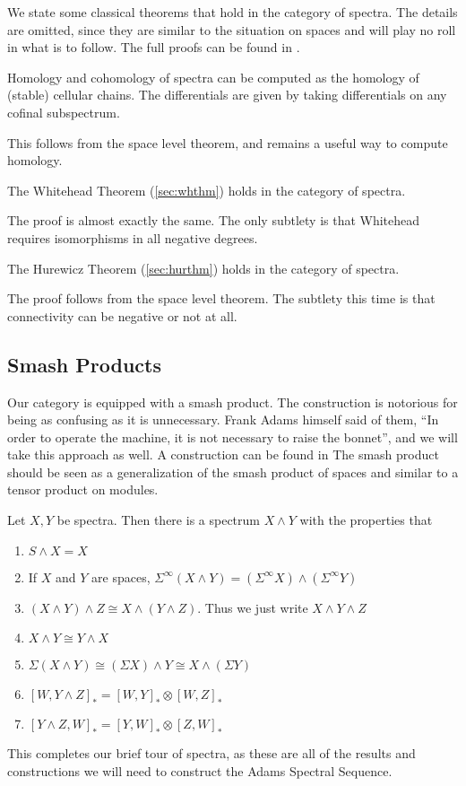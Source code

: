 We state some classical theorems that hold in the category of spectra.
The details are omitted, since they are similar to the situation on spaces and will play no roll in what is to follow.  
The full proofs can be found in \cite[Ch~2]{AdamsStable}.  

\begin{Theorem}
  Homology and cohomology of spectra can be computed as the homology of (stable) cellular chains.  
  The differentials are given by taking differentials on any cofinal subspectrum.
\end{Theorem}

This follows from the space level theorem, and remains a useful way to compute homology.  

\begin{Theorem}
  The Whitehead Theorem (\ref{sec:whthm}) holds in the category of spectra.
\end{Theorem}

The proof is almost exactly the same.  
The only subtlety is that Whitehead requires isomorphisms in all negative degrees.

\begin{Theorem}
  The Hurewicz Theorem (\ref{sec:hurthm}) holds in the category of spectra.
\end{Theorem}

The proof follows from the space level theorem.
The subtlety this time is that connectivity can be negative or not at all.  


\subsection{Smash Products}

Our category is equipped with a smash product.
The construction is notorious for being as confusing as it is unnecessary.  Frank Adams himself said of them,  
``In order to operate the machine, it is not necessary to raise the bonnet'', and we will take this approach as well.  
A construction can be found in \cite[Ch~4]{AdamsStable}
The smash product should be seen as a generalization of the smash product of spaces and similar to a tensor product on modules.  

\begin{Theorem}
  Let $X,Y$ be spectra.  Then there is a spectrum $X\wedge Y$ with the properties that
  \begin{enumerate}
    \item $S\wedge X=X$
    \item If $X$ and $Y$ are spaces, $\Sigma^\infty(X\wedge Y)=(\Sigma^\infty X)\wedge (\Sigma^\infty Y)$
    \item $(X\wedge Y)\wedge Z\cong X\wedge (Y\wedge Z)$.  
      Thus we just write $X\wedge Y\wedge Z$
    \item  $X\wedge Y\cong Y\wedge X$
    \item  $\Sigma(X\wedge Y)\cong(\Sigma X)\wedge Y\cong X\wedge (\Sigma Y)$
    \item $[W,Y\wedge Z]_*=[W,Y]_*\otimes [W,Z]_*$
    \item $[Y\wedge Z,W]_*=[Y,W]_*\otimes [Z,W]_*$
  \end{enumerate}
\end{Theorem}


This completes our brief tour of spectra, as these are all of the results and constructions we will need to construct the Adams Spectral Sequence.  


